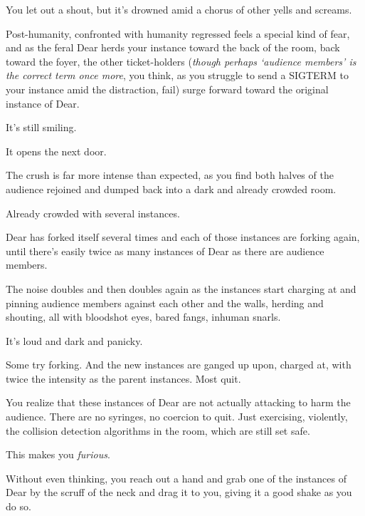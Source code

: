 You let out a shout, but it's drowned amid a chorus of other yells and screams.

Post-humanity, confronted with humanity regressed feels a special kind of fear, and as the feral Dear herds your instance toward the back of the room, back toward the foyer, the other ticket-holders (\emph{though perhaps `audience members' is the correct term once more}, you think, as you struggle to send a SIGTERM to your instance amid the distraction, fail) surge forward toward the original instance of Dear.

\newpage

\null
\vfill

It's still smiling.

\null
\vfill

\newpage
\null
\vfill

It opens the next door.

\vfill

\newpage

The crush is far more intense than expected, as you find both halves of the audience rejoined and dumped back into a dark and already crowded room.

Already crowded with several instances.

Dear has forked itself several times and each of those instances are forking again, until there's easily twice as many instances of Dear as there are audience members.

The noise doubles and then doubles again as the instances start charging at and pinning audience members against each other and the walls, herding and shouting, all with bloodshot eyes, bared fangs, inhuman snarls.

It's loud and dark and panicky.

Some try forking. And the new instances are ganged up upon, charged at, with twice the intensity as the parent instances. Most quit.

You realize that these instances of Dear are not actually attacking to harm the audience. There are no syringes, no coercion to quit. Just exercising, violently, the collision detection algorithms in the room, which are still set safe.

This makes you \emph{furious}.


Without even thinking, you reach out a hand and grab one of the instances of Dear by the scruff of the neck and drag it to you, giving it a good shake as you do so.

